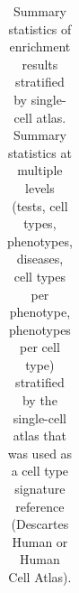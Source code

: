 \documentclass[
]{agujournal2019}
\begin{document}
\begin{longtable}[]{@{}
  >{\raggedright\arraybackslash}p{}
  >{\raggedright\arraybackslash}p{}
  >{\raggedright\arraybackslash}p{}
  >{\raggedright\arraybackslash}p{}@{}}

\caption{\label{tbl-summary}Summary statistics of enrichment results
stratified by single-cell atlas. Summary statistics at multiple levels
(tests, cell types, phenotypes, diseases, cell types per phenotype,
phenotypes per cell type) stratified by the single-cell atlas that was
used as a cell type signature reference (Descartes Human or Human Cell
Atlas).}

\tabularnewline


\end{longtable}
\end{document}
